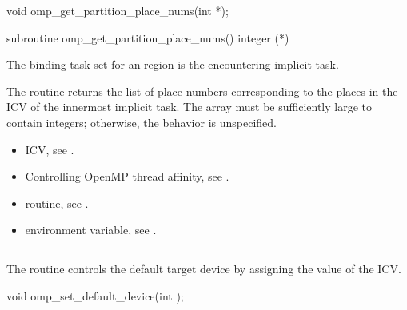 \format
\ccppspecificstart
\begin{boxedcode}
void omp\_get\_partition\_place\_nums(int *);
\end{boxedcode}
\ccppspecificend

\fortranspecificstart
\begin{boxedcode}
subroutine omp\_get\_partition\_place\_nums()
integer (*)
\end{boxedcode}
\fortranspecificend

\binding
The binding task set for an  region is the encountering implicit task.

\effect
The  routine returns the list of 
place numbers corresponding to the places in the  
ICV of the innermost implicit task. The array must be sufficiently large 
to contain  integers; otherwise, 
the behavior is unspecified.

\crossreferences
\begin{itemize}
\item {} ICV, see 
.

\item Controlling OpenMP thread affinity, see 
. 

\item {} routine, see 
.

\item {} environment variable, see 
.
\end{itemize}





\subsection{}
\label{subsec:omp_set_default_device}

\summary

The  routine controls the default target device by 
assigning the value of the  ICV.

\format
\ccppspecificstart
\begin{boxedcode}
void omp\_set\_default\_device(int );
\end{boxedcode}
\ccppspecificend

